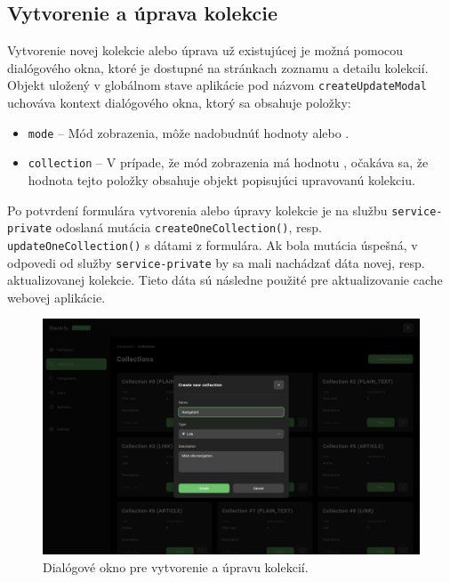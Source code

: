 \subsection{Vytvorenie a úprava kolekcie}
Vytvorenie novej kolekcie alebo úprava už existujúcej je možná pomocou dialógového okna, ktoré je dostupné na stránkach zoznamu a detailu kolekcií. Objekt uložený v globálnom stave aplikácie pod názvom \texttt{createUpdateModal} uchováva kontext dialógového okna, ktorý sa obsahuje položky:

\begin{itemize}
	\item \texttt{mode} -- Mód zobrazenia, môže nadobudnúť hodnoty  alebo .
	\item \texttt{collection} -- V prípade, že mód zobrazenia má hodnotu , očakáva sa, že hodnota tejto položky obsahuje objekt popisujúci upravovanú kolekciu.
\end{itemize}

\noindent Po potvrdení formulára vytvorenia alebo úpravy kolekcie je na službu \texttt{service-private} odoslaná mutácia \texttt{createOneCollection()}, resp. \texttt{updateOneCollection()} s dátami z formulára. Ak bola mutácia úspešná, v odpovedi od služby \texttt{service-private} by sa mali nachádzať dáta novej, resp. aktualizovanej kolekcie. Tieto dáta sú následne použité pre aktualizovanie cache webovej aplikácie.

\begin{figure}[h]
	\centering
	\includegraphics[scale=0.085]{obrazky-figures/screenshot_collection_create}
	\caption{Dialógové okno pre vytvorenie a úpravu kolekcií.}
\end{figure}

